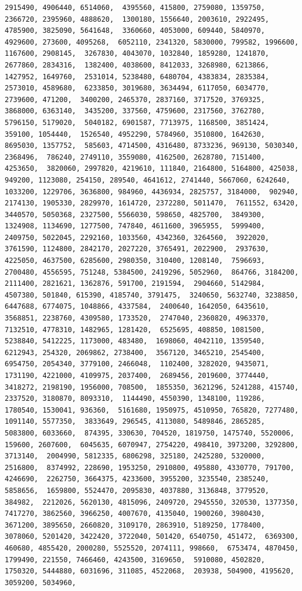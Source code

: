 \documentclass[
]{article}
\begin{document}
\begin{verbatim}
2915490, 4906440, 6514060,  4395560, 415800, 2759080, 1359750, 2366720, 2395960, 4888620,  1300180, 1556640, 2003610, 2922495, 4785900, 3825090, 5641648,  3360660, 4053000, 609440, 5840970, 4929600, 273600, 4095268,  6052110, 2341320, 5830000, 799582, 1996600, 1167600, 2908145,  3267830, 4043070, 1032840, 1859280, 1241870, 2677860, 2834316,  1382400, 4038600, 8412033, 3268980, 6213866, 1427952, 1649760,  2531014, 5238480, 6480704, 4383834, 2835384, 2573010, 4589680,  6233850, 3019680, 3634494, 6117050, 6034770, 2739600, 471200,  3400200, 2465370, 2837160, 3717520, 3769325, 3868000, 6363140,  3435200, 337560, 4759600, 2317560, 3762780, 5796150, 5179020,  5040182, 6901587, 7713975, 1168500, 3851424, 359100, 1054440,  1526540, 4952290, 5784960, 3510800, 1642630, 8695030, 1357752,  585603, 4714500, 4316480, 8733236, 969130, 5030340, 2368496,  786240, 2749110, 3559080, 4162500, 2628780, 7151400, 4253650,  3820060, 2997820, 4219610, 111840, 2164800, 5164800, 425038,  949200, 1123080, 254150, 289540, 4641612, 2741440, 5667060, 6242640,  1033200, 1229706, 3636800, 984960, 4436934, 2825757, 3184000,  902940, 2174130, 1905330, 2829970, 1614720, 2372280, 5011470,  7611552, 63420, 3440570, 5050368, 2327500, 5566030, 598650, 4825700,  3849300, 1324908, 1134690, 1277500, 747840, 4611600, 3965955,  5999400, 2409750, 5022045, 2292160, 1033560, 4342360, 3264560,  3922020, 3761590, 1124800, 2842170, 2027220, 3765491, 2022900,  2937630, 4225050, 4637500, 6285600, 2980350, 310400, 1208140,  7596693, 2700480, 4556595, 751248, 5384500, 2419296, 5052960,  864766, 3184200, 2111400, 2821621, 1362876, 591700, 2191594,  2904660, 5142984, 4507380, 501840, 615390, 4185740, 3791475,  3240650, 5632740, 3238850, 6447688, 6774075, 1048866, 4337584,  2400640, 1642050, 6435610, 3568851, 2238760, 4309580, 1733520,  2747040, 2360820, 4963370, 7132510, 4778310, 1482965, 1281420,  6525695, 408850, 1081500, 5238840, 5412225, 1173000, 483480,  1698060, 4042110, 1359540, 6212943, 254320, 2069862, 2738400,  3567120, 3465210, 2545400, 6954750, 2054340, 3779100, 2466048,  1102400, 3282020, 9435071, 1731190, 4221000, 4109975, 2037400,  2689456, 2019600, 3774440, 3418272, 2198190, 1956000, 708500,  1855350, 3621296, 5241288, 415740, 2337520, 3180870, 8093310,  1144490, 4550390, 1348100, 119286, 1780540, 1530041, 936360,  5161680, 1950975, 4510950, 765820, 7277480, 1091140, 5577350,  3833649, 296545, 4113080, 5489846, 2865285, 5083800, 6033660,  874395, 330630, 704520, 1819750, 1475740, 5520006, 159600, 2607600,  6045635, 6070947, 2754220, 498410, 3973200, 3292800, 3713140,  2004990, 5812335, 6806298, 325180, 2425280, 5320000, 2516800,  8374992, 228690, 1953250, 2910800, 495880, 4330770, 791700, 4246690,  2262750, 3664375, 4233600, 3955200, 3235540, 2385240, 5858656,  1659800, 5524470, 2095830, 4037880, 3136848, 3779520, 384982,  2212026, 5620130, 4815096, 2409720, 2945550, 320530, 1377350,  7417270, 3862560, 3966250, 4007670, 4135040, 1900260, 3980430,  3671200, 3895650, 2660820, 3109170, 2863910, 5189250, 1778400,  3078060, 5201420, 3422420, 3722040, 501420, 6540750, 451472,  6369300, 460680, 4855420, 2000280, 5525520, 2074111, 998660,  6753474, 4870450, 1799490, 221550, 7466460, 4243500, 3169650,  5910080, 4502820, 1750320, 5444880, 6031696, 311085, 4522068,  203938, 504900, 4195620, 3059200, 5034960, 
\end{verbatim}
\end{document}
